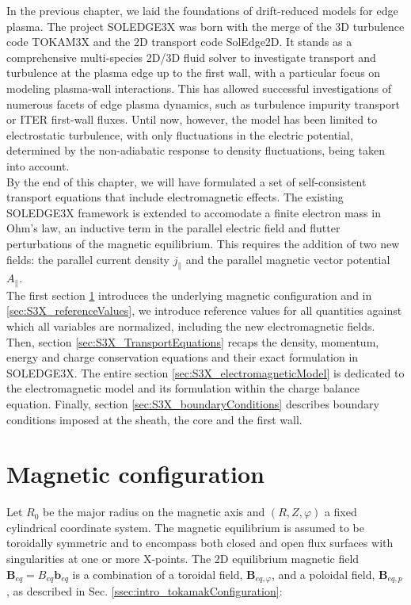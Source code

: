 \vfill
\newpage


In the previous chapter, we laid the foundations of drift-reduced models for edge plasma. The project SOLEDGE3X was born with the merge of the 3D turbulence code TOKAM3X\cite{tamain2016tokam3x} and the 2D transport code SolEdge2D\cite{Bufferand_2015}. It stands as a comprehensive multi-species 2D/3D fluid solver to investigate transport and turbulence at the plasma edge up to the first wall, with a particular focus on modeling plasma-wall interactions. This has allowed successful investigations of numerous facets of edge plasma dynamics, such as turbulence\cite{Bufferand_2021} impurity transport\cite{Ciraolo2021} or ITER first-wall fluxes\cite{Rivals2022}. Until now, however, the model has been limited to electrostatic turbulence, with only fluctuations in the electric potential, determined by the non-adiabatic response to density fluctuations, being taken into account. \\

By the end of this chapter, we will have formulated a set of self-consistent transport equations that include electromagnetic effects. The existing SOLEDGE3X framework is extended to accomodate a finite electron mass in Ohm's law, an inductive term in the parallel electric field and flutter perturbations of the magnetic equilibrium. This requires the addition of two new fields: the parallel current density $j_\parallel$ and the parallel magnetic vector potential $A_\parallel$. \\

The first section \ref{sec:S3X_CoordinateSystem} introduces the underlying magnetic configuration and in \ref{sec:S3X_referenceValues}, we introduce reference values for all quantities against which all variables are normalized, including the new electromagnetic fields. Then, section \ref{sec:S3X_TransportEquations} recaps the density, momentum, energy and charge conservation equations and their exact formulation in SOLEDGE3X. The entire section \ref{sec:S3X_electromagneticModel} is dedicated to the electromagnetic model and its formulation within the charge balance equation. Finally, section \ref{sec:S3X_boundaryConditions} describes boundary conditions imposed at the sheath, the core and the first wall.



\section{Magnetic configuration}
\label{sec:S3X_CoordinateSystem}
Let $R_0$ be the major radius on the magnetic axis and $(R, Z, \varphi)$ a fixed cylindrical coordinate system. The magnetic equilibrium is assumed to be toroidally symmetric and to encompass both closed and open flux surfaces with singularities at one or more X-points. The 2D equilibrium magnetic field $\mathbf{B}_{eq} = B_{eq} \mathbf{b}_{eq}$ is a combination of a toroidal field, $\mathbf{B}_{eq,\varphi}$, and a poloidal field, $\mathbf{B}_{eq,p}$, as described in Sec. \ref{ssec:intro_tokamakConfiguration}:

